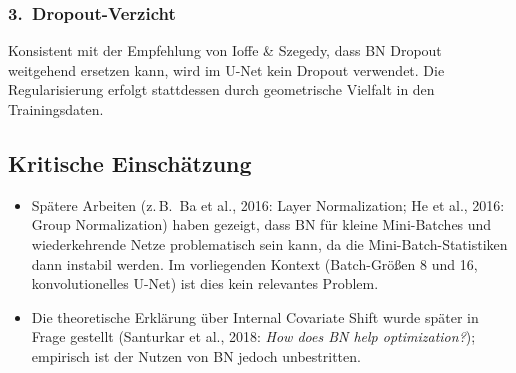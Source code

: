 \documentclass[a4paper,12pt]{article}
\begin{document}
\subsubsection*{3.\ Dropout-Verzicht}

Konsistent mit der Empfehlung von Ioffe \& Szegedy, dass BN Dropout weitgehend
ersetzen kann, wird im U-Net kein Dropout verwendet. Die Regularisierung erfolgt
stattdessen durch geometrische Vielfalt in den Trainingsdaten.

\subsection*{Kritische Einsch\"atzung}

\begin{itemize}
  \item Sp\"atere Arbeiten (z.\,B.\ Ba et al., 2016: Layer Normalization;
    He et al., 2016: Group Normalization) haben gezeigt, dass BN f\"ur kleine
    Mini-Batches und wiederkehrende Netze problematisch sein kann, da die
    Mini-Batch-Statistiken dann instabil werden. Im vorliegenden Kontext
    (Batch-Gr\"o\ss en 8 und 16, konvolutionelles U-Net) ist dies kein relevantes
    Problem.

  \item Die theoretische Erkl\"arung \"uber Internal Covariate Shift wurde sp\"ater
    in Frage gestellt (Santurkar et al., 2018: \emph{How does BN help optimization?});
    empirisch ist der Nutzen von BN jedoch unbestritten.
\end{itemize}
\end{document}
